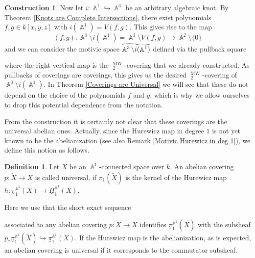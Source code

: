 \documentclass[english]{amsart}
\theoremstyle{definition}
\newtheorem{de}[prop]{Definition}
\newtheorem{con}[prop]{Construction}
\newcommand\reallywidetilde[1]{\ThisStyle{%
  \setbox0=\hbox{$\SavedStyle#1$}%
  \stackengine{-.1\LMpt}{$\SavedStyle#1$}{%
    \stretchto{\scaleto{\SavedStyle\mkern.2mu\AC}{.5150\wd0}}{.4\ht0}%
  }{O}{c}{F}{T}{S}%
}}
\DeclareMathOperator{\A}{\mathbb{A}}
\DeclareMathOperator{\komma}{\hspace{-3pt},}
\DeclareMathOperator{\Deck}{Deck}
\DeclareMathOperator{\KK}{\underline{K}}
\DeclareMathOperator{\MW}{MW}
\begin{document}
\begin{con}
Now let $i \colon \A^1 \hookrightarrow \A^3$ be an arbitrary algebraic knot. By Theorem \ref{Knots are Complete Intersections}, there exist polynomials $f,g \in k[x,y,z]$ with $i(\A^1) = V(f,g)$. This gives rise to the map
$$(f,g) \colon \A^3 \setminus i(\A^1) = \A^3 \setminus V(f,g) \rightarrow \A^2 \setminus \lbrace 0 \rbrace$$
and we can consider the motivic space $\reallywidetilde{\A^3 \setminus i(\A^1)}$ defined via the pullback square
\begin{center}
\end{center}
where the right vertical map is the $\KK^{\MW}_2$-covering that we already constructed. As pullbacks of coverings are coverings, this gives us the desired $\KK^{\MW}_2$-covering of $\A^3 \setminus i(\A^1)$. In Theorem \ref{Coverings are Universal} we will see that these do not depend on the choice of the polynomials $f$ and $g$, which is why we allow ourselves to drop this potential dependence from the notation.
\end{con}
From the construction it is certainly not clear that these coverings are the universal abelian ones. Actually, since the Hurewicz map in degree $1$ is not yet known to be the abelianization (see also Remark \ref{Motivic Hurewicz in deg 1}), we define this notion as follows.
\begin{de}
Let $X$ be an $\A^1$-connected space over $k$. An abelian covering $p \colon \widetilde{X} \to X$ is called universal, if $\pi_1(\widetilde{X})$ is the kernel of the Hurewicz map $h \colon \underline{\pi}_1^{\A^1}\!(X) \to \underline{H}_1^{\A^1}\!(X)$.
\end{de}
Here we use that the short exact sequence 
\begin{center}
\end{center}
associated to any abelian covering $p \colon \widetilde{X} \to X$ identifies $\underline{\pi}_1^{\A^1}\!(\widetilde{X})$ with the subsheaf $p_*\underline{\pi}_1^{\A^1}\!(\widetilde{X}) \hookrightarrow \underline{\pi}_1^{\A^1}\!(X)$. If the Hurewicz map is the abelianization, as is expected, an abelian covering is universal if it corresponds to the commutator subsheaf.
\end{document}
